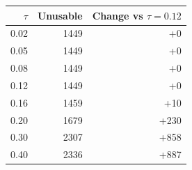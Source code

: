\begin{tabular}{rrr}
\toprule
$\tau$ & Unusable & Change vs $\tau{=}0.12$ \\
\midrule
0.02 & 1449 & +0 \\
0.05 & 1449 & +0 \\
0.08 & 1449 & +0 \\
0.12 & 1449 & +0 \\
0.16 & 1459 & +10 \\
0.20 & 1679 & +230 \\
0.30 & 2307 & +858 \\
0.40 & 2336 & +887 \\
\bottomrule
\end{tabular}
